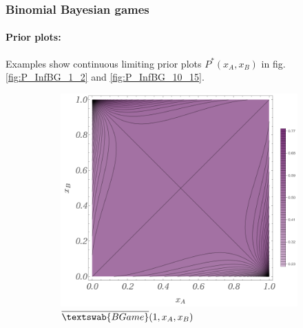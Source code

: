 \documentclass{article}
\theoremstyle{definition}
\newcommand{\InfBG}[1]{$\overline{\textswab{BGame}}(#1)$}
\begin{document}
\subsubsection{Binomial Bayesian games}

\paragraph{Prior plots:} Examples show continuous limiting prior plots $P^*(x_A,x_B)$ in fig. \ref{fig:P_InfBG_1_2} and \ref{fig:P_InfBG_10_15}.

\begin{figure}[H]
    \centering
    \begin{subfigure}[b]{0.4\textwidth}
        \includegraphics[width=\textwidth]{img/BinomialBayesian_1.png}
        \caption{\InfBG{1,x_A,x_B}}
        \label{fig:PBG_1}
    \end{subfigure}
    \hspace{0.05\textwidth} %
    \begin{subfigure}[b]{0.4\textwidth}

\end{subfigure}
\end{figure}
\end{document}
